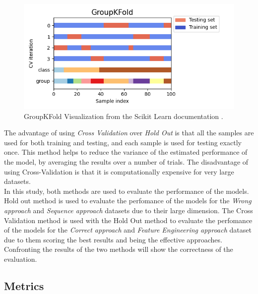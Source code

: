 \begin{itemize}
                    \begin{figure}[H]
                        \centering
                        \includegraphics[width=1.0\textwidth]{../src/resources/images/other/groupkfold.png}
                        \caption{
                          GroupKFold Visualization from the Scikit Learn documentation \cite{scikit-learn}.
                        }
                        \label{fig:groupkfold}
                    \end{figure}
                \end{itemize}
                
        The advantage of using \textit{Cross Validation} over \textit{Hold Out} is that all the samples are used for both training and testing, and each sample is used for testing exactly once. This method helps to reduce the variance of the estimated performance of the model, by averaging the results over a number of trials. The disadvantage of using Cross-Validation is that it is computationally expensive for very large datasets. \\ 

        In this study, both methods are used to evaluate the performance of the models. Hold out method is used to evaluate the perfomance of the models for the \textit{Wrong approach} and \textit{Sequence approach} datasets due to their large dimension. The Cross Validation method is used  with the Hold Out method to evaluate the perfomance of the models for the \textit{Correct approach} and \textit{Feature Engineering approach} dataset due to them scoring the best results and being the effective approaches. Confronting the results of the two methods will show the correctness of the evaluation. \\
        
        \subsection{Metrics}


